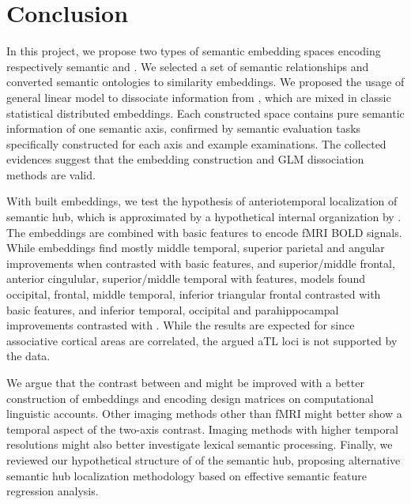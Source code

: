 \chapter{Conclusion} %

\label{chap:conclusion} 

In this project, we propose two types of semantic embedding spaces encoding respectively semantic \similarity and \association. We selected a set of \similarity semantic relationships and converted semantic ontologies to similarity embeddings. We proposed the usage of general linear model to dissociate \similarity information from \association, which are mixed in classic statistical distributed embeddings. Each constructed space contains pure semantic information of one semantic axis, confirmed by semantic evaluation tasks specifically constructed for each axis and example examinations. The collected evidences suggest that the \similarity embedding construction and GLM dissociation methods are valid.

With built embeddings, we test the hypothesis of anteriotemporal localization of semantic hub, which is approximated by a hypothetical internal organization by \similarity. The embeddings are combined with basic features to encode fMRI BOLD signals. While \similarity embeddings find mostly middle temporal, superior parietal and angular improvements when contrasted with basic features, and superior/middle frontal, anterior cingulular, superior/middle temporal with \association features, \association models found occipital, frontal, middle temporal, inferior triangular frontal contrasted with basic features, and inferior temporal, occipital and parahippocampal improvements contrasted with \similarity. While the results are expected for \association since associative cortical areas are correlated, the argued aTL loci is not supported by the data.

We argue that the contrast between \similarity and \association might be improved with a better construction of \similarity embeddings and encoding design matrices on computational linguistic accounts. Other imaging methods other than fMRI might better show a temporal aspect of the two-axis contrast. Imaging methods with higher temporal resolutions might also better investigate lexical semantic processing. Finally, we reviewed our hypothetical structure of \similarity of the semantic hub, proposing alternative semantic hub localization methodology based on effective semantic feature regression analysis.